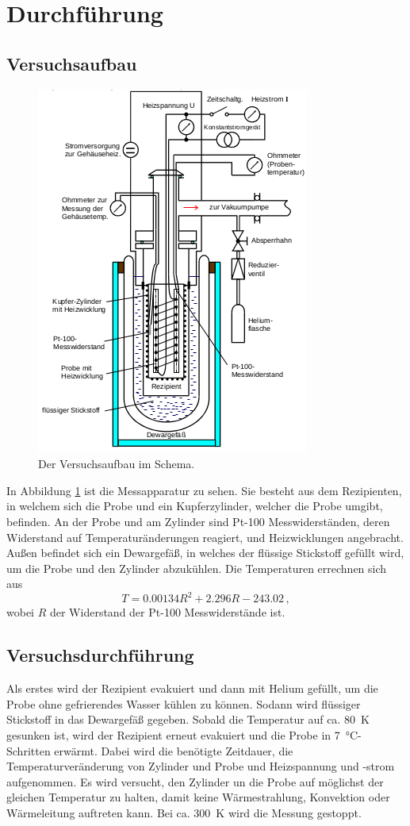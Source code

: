 \section{Durchführung}
\subsection{Versuchsaufbau}
\begin{figure}
  \centering
  \includegraphics[scale=0.4]{aufbau.png}
  \caption{Der Versuchsaufbau im Schema.}
  \label{fig:1}
\end{figure}
In Abbildung \ref{fig:1} ist die Messapparatur zu sehen. Sie besteht aus dem Rezipienten,
in welchem sich die Probe und ein Kupferzylinder, welcher die Probe umgibt, befinden.
An der Probe und am Zylinder sind Pt-100 Messwiderständen,
deren Widerstand auf Temperaturänderungen reagiert, und Heizwicklungen angebracht.
Außen befindet sich ein Dewargefäß,
in welches der flüssige Stickstoff gefüllt wird, um die Probe und den Zylinder abzukühlen.
Die Temperaturen errechnen sich aus
\begin{equation}
  T = 0.00134 R^2 + 2.296 R - 243.02 \, ,
  \label{widerstand}
\end{equation}
wobei $R$ der Widerstand der Pt-100 Messwiderstände ist.

\subsection{Versuchsdurchführung}
Als erstes wird der Rezipient evakuiert und dann mit Helium gefüllt, um die Probe
ohne gefrierendes Wasser kühlen zu können. Sodann wird flüssiger Stickstoff in das
Dewargefäß gegeben. Sobald die Temperatur auf ca. \SI{80}{\kelvin} gesunken ist,
wird der Rezipient erneut evakuiert und die Probe in \SI{7}{\celsius}-
Schritten erwärmt. Dabei wird die benötigte Zeitdauer, die Temperaturveränderung
von Zylinder und Probe und Heizspannung und -strom aufgenommen. Es wird versucht,
den Zylinder un die Probe auf möglichst der gleichen Temperatur zu halten, damit
keine Wärmestrahlung, Konvektion oder Wärmeleitung auftreten kann. Bei ca. \SI{300}{\kelvin}
wird die Messung gestoppt.
